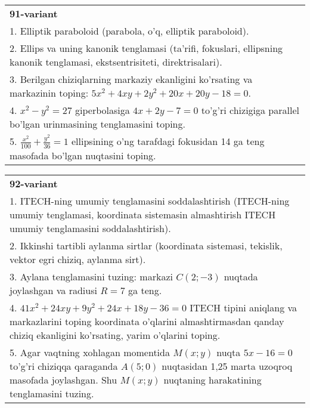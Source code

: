 \documentclass{article}
\begin{document}
\begin{tabular}{m{17cm}}
\textbf{91-variant}\\
1. Elliptik paraboloid (parabola, o'q, elliptik paraboloid).\\

2. Ellips va uning kanonik tenglamasi (ta'rifi, fokuslari, ellipsning kanonik tenglamasi, ekstsentrisiteti, direktrisalari).\\

3. Berilgan chiziqlarning markaziy ekanligini ko'rsating va markazinin toping: $5x^{2}+4xy+2y^{2}+20x+20y-18=0$.\\

4. $x^{2} - y^{2} = 27$ giperbolasiga $4x + 2y - 7 = 0$ to'g'ri chizigiga parallel bo'lgan urinmasining tenglamasini toping.  \\

5. $\frac{x^{2}}{100} + \frac{y^{2}}{36} = 1$ ellipsining o'ng tarafdagi fokusidan 14 ga teng masofada bo'lgan nuqtasini toping.  
\end{tabular}
\vspace{1cm}


\begin{tabular}{m{17cm}}
\textbf{92-variant}\\
1. ITECH-ning umumiy tenglamasini soddalashtirish (ITECH-ning umumiy tenglamasi, koordinata sistemasin almashtirish ITECH umumiy tenglamasini soddalashtirish).\\

2. Ikkinshi tartibli aylanma sirtlar (koordinata sistemasi, tekislik, vektor egri chiziq, aylanma sirt).\\

3. Aylana tenglamasini tuzing: markazi $C(2;-3)$ nuqtada joylashgan va radiusi $R=7$ ga teng.\\

4. $41x^{2} + 24xy + 9y^{2} + 24x + 18y - 36 = 0$ ITECH tipini aniqlang va markazlarini toping koordinata o'qlarini almashtirmasdan qanday chiziq ekanligini ko'rsating, yarim o'qlarini toping.  \\

5. Agar vaqtning xohlagan momentida $M(x;y)$ nuqta $5x - 16 = 0$ to'g'ri chiziqqa qaraganda $A(5;0)$ nuqtasidan 1,25 marta uzoqroq masofada joylashgan. Shu $M(x;y)$ nuqtaning harakatining tenglamasini tuzing.  
\end{tabular}
\vspace{1cm}
\end{document}
